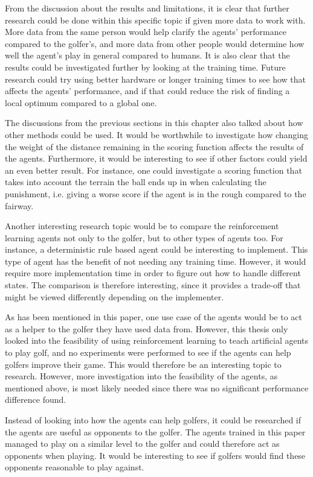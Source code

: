 \documentclass{kththesis}
\begin{document}
From the discussion about the results and limitations, it is clear that further research could be done within this specific topic if given more data to work with. More data from the same person would help clarify the agents' performance compared to the golfer's, and more data from other people would determine how well the agent's play in general compared to humans. It is also clear that the results could be investigated further by looking at the training time. Future research could try using better hardware or longer training times to see how that affects the agents' performance, and if that could reduce the risk of finding a local optimum compared to a global one.

The discussions from the previous sections in this chapter also talked about how other methods could be used. It would be worthwhile to investigate how changing the weight of the distance remaining in the scoring function affects the results of the agents. Furthermore, it would be interesting to see if other factors could yield an even better result. For instance, one could investigate a scoring function that takes into account the terrain the ball ends up in when calculating the punishment, i.e. giving a worse score if the agent is in the rough compared to the fairway. 

Another interesting research topic would be to compare the reinforcement learning agents not only to the golfer, but to other types of agents too. For instance, a deterministic rule based agent could be interesting to implement. This type of agent has the benefit of not needing any training time. However, it would require more implementation time in order to figure out how to handle different states. The comparison is therefore interesting, since it provides a trade-off that might be viewed differently depending on the implementer.

As has been mentioned in this paper, one use case of the agents would be to act as a helper to the golfer they have used data from. However, this thesis only looked into the feasibility of using reinforcement learning to teach artificial agents to play golf, and no experiments were performed to see if the agents can help golfers improve their game. This would therefore be an interesting topic to research. However, more investigation into the feasibility of the agents, as mentioned above, is most likely needed since there was no significant performance difference found. 

Instead of looking into how the agents can help golfers, it could be researched if the agents are useful as opponents to the golfer. The agents trained in this paper managed to play on a similar level to the golfer and could therefore act as opponents when playing. It would be interesting to see if golfers would find these opponents reasonable to play against.
\end{document}
